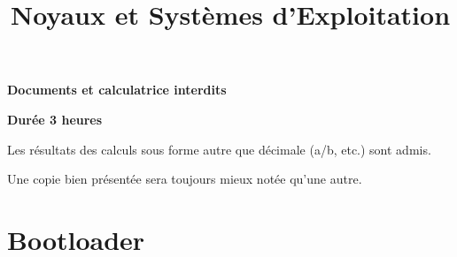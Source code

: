 %
%
%
%
%

%
%

%
%

\def\path{../../..}

%
%



%
%

\title{Noyaux et Syst\`emes d'Exploitation}

%
%

\rhead{}

%
%



%
%

\maketitle

%
%

\indentation{}

%
%

\begin{center}

\textbf{Documents et calculatrice interdits}

\textbf{Dur\'ee 3 heures}

\scriptsize{Les r\'esultats des calculs sous forme autre que d\'ecimale (a/b, etc.) sont admis.}

\scriptsize{Une copie bien pr\'esent\'ee sera toujours mieux not\'ee qu'une autre.}

\end{center}

%
%

%
%

\section{{Bootloader}
         {\hfill{} }}

